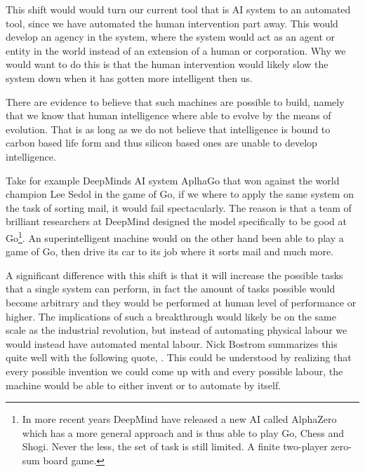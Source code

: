 \documentclass[12pt,A4]{report}
\theoremstyle{definition}
\begin{document}
This shift would would turn our current tool that is AI system to an automated tool, since we have automated the human intervention part away. This would develop an agency in the system, where the system would act as an agent or entity in the world instead of an extension of a human or corporation. Why we would want to do this is that the human intervention would likely slow the system down when it has gotten more intelligent then us.  

There are evidence to believe that such machines are possible to build, namely that we know that human intelligence where able to evolve by the means of evolution. That is as long as we do not believe that intelligence is bound to carbon based life form and thus silicon based ones are unable to develop intelligence.

Take for example DeepMinds AI system AplhaGo that won against the world champion Lee Sedol in the game of Go, if we where to apply the same system on the task of sorting mail, it would fail spectacularly. The reason is that a team of brilliant researchers at DeepMind designed the model specifically to be good at Go\footnote{In more recent years DeepMind have released a new AI called AlphaZero which has a more general approach and is thus able to play Go, Chess and Shogi. Never the less, the set of task is still limited. A finite two-player zero-sum board game.}. An superintelligent machine would on the other hand been able to play a game of Go, then drive its car to its job where it sorts mail and much more. 

A significant difference with this shift is that it will increase the possible tasks that a single system can perform, in fact the amount of tasks possible would become arbitrary and they would be performed at human level of performance or higher. The implications of such a breakthrough would likely be on the same scale as the industrial revolution, but instead of automating physical labour we would instead have automated mental labour. Nick Bostrom summarizes this quite well with the following quote, \autocite{Bostrom}. This could be understood by realizing that every possible invention we could come up with and every possible labour, the machine would be able to either invent or to automate by itself.
\end{document}
